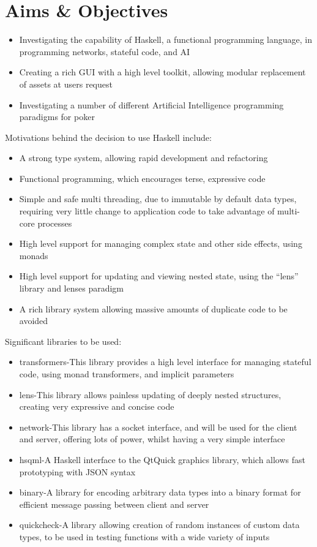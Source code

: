 \section{Aims \& Objectives}

\begin{itemize}
\item Investigating the capability of Haskell, a functional programming language, in programming networks, stateful code, and AI
\item Creating a rich GUI with a high level toolkit, allowing modular replacement of assets at users request
\item Investigating a number of different Artificial Intelligence programming paradigms for poker
\end{itemize}
Motivations behind the decision to use Haskell include:
\begin{itemize}
\item A strong type system, allowing rapid development and refactoring
\item Functional programming, which encourages terse, expressive code
\item Simple and safe multi threading, due to immutable by default data types, requiring very little change to application code to take advantage of multi-core processes
\item High level support for managing complex state and other side effects, using monads\cite{benton2000}
\item High level support for updating and viewing nested state, using the ``lens'' library and lenses paradigm\cite{bohannon2006}
\item A rich library system allowing massive amounts of duplicate code to be avoided
\end{itemize}
Significant libraries to be used:
\begin{itemize}
\item transformers-This library provides a high level interface for managing stateful code, using monad transformers, and implicit parameters
\item lens-This library allows painless updating of deeply nested structures, creating very expressive and concise code
\item network-This library has a socket interface, and will be used for the client and server, offering lots of power, whilst having a very simple interface
\item hsqml-A Haskell interface to the QtQuick graphics library, which allows fast prototyping with JSON syntax
\item binary-A library for encoding arbitrary data types into a binary format for efficient message passing between client and server
\item quickcheck-A library allowing creation of random instances of custom data types, to be used in testing functions with a wide variety of inputs
\end{itemize}
